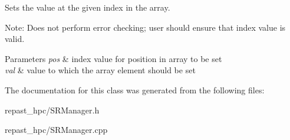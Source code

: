 Sets the value at the given index in the array. 

Note\-: Does not perform error checking; user should ensure that index value is valid.


\begin{DoxyParams}{Parameters}
{\em pos} & index value for position in array to be set \\
\hline
{\em val} & value to which the array element should be set \\
\hline
\end{DoxyParams}


The documentation for this class was generated from the following files\-:\begin{DoxyCompactItemize}
\item 
repast\-\_\-hpc/S\-R\-Manager.\-h\item 
repast\-\_\-hpc/S\-R\-Manager.\-cpp\end{DoxyCompactItemize}
